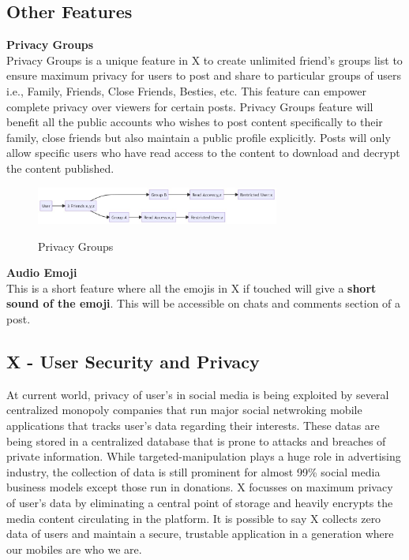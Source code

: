 \documentclass[letterpaper,11pt]{article}
\begin{document}
\subsection{\textbf{Other Features}}

\textbf{Privacy Groups}\\

Privacy Groups is a unique feature in X to create unlimited friend's groups list to ensure maximum privacy for users to post and share to particular groups of users i.e., Family, Friends, Close Friends, Besties, etc. This feature can empower complete privacy over viewers for certain posts. Privacy Groups feature will benefit all the public accounts who wishes to post content specifically to their family, close friends but also maintain a public profile explicitly. Posts will only allow specific users who have read access to the content to download and decrypt the content published.  \\

\begin{figure}[H]
\includegraphics[width=8cm]{privacygroups}\\
\caption{Privacy Groups}
\end{figure}

\textbf{Audio Emoji}\\

This is a short feature where all the emojis in X if touched will give a \textbf{short sound of the emoji}. This will be accessible on chats and comments section of a post.\\

\subsection{\textbf{X - User Security and Privacy}}

At current world, privacy of user's in social media is being exploited by several centralized monopoly companies that run major social netwroking mobile applications that tracks user's data regarding their interests. These datas are being stored in a centralized database that is prone to attacks and breaches of private information. While targeted-manipulation plays a huge role in advertising industry, the collection of data is still prominent for almost 99\% social media business models except those run in donations. X focusses on maximum privacy of user's data by eliminating a central point of storage and heavily encrypts the media content circulating in the platform. It is possible to say X collects zero data of users and maintain a secure, trustable application in a generation where our mobiles are who we are.\\
\end{document}
